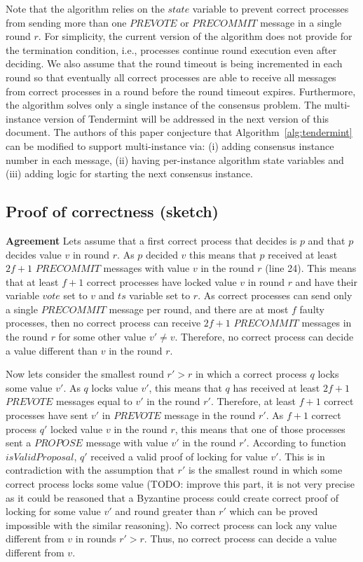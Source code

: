 Note that the algorithm relies on the $state$ variable to prevent correct processes from sending more than one $PREVOTE$ or $PRECOMMIT$ message in a single round $r$. For simplicity, the current version of the algorithm does not provide for the termination condition, i.e., processes continue round execution even after deciding. We also assume that the round timeout is being incremented in each round so that eventually all correct processes are able to receive all messages from correct processes in a round before the round timeout expires.  
Furthermore, the algorithm solves only a single instance of the consensus problem. The multi-instance version of Tendermint will be addressed in the next version of this document. The authors of this paper conjecture that Algorithm~\ref{alg:tendermint} can be modified to support multi-instance via: (i) adding consensus instance number in each message, (ii) having per-instance algorithm state variables and (iii) adding logic for starting the next consensus instance.

\subsection{Proof of correctness (sketch)}

\textbf{Agreement} Lets assume that a first correct process that decides is $p$ and that $p$ decides value $v$ in round $r$. As $p$ decided $v$ this means that $p$ received at least $2f+1$ $PRECOMMIT$ messages with value $v$ in the round $r$ (line 24). This means that at least $f+1$ correct processes have locked value $v$ in round $r$ and have their variable $vote$ set to $v$ and $ts$ variable set to $r$. As correct processes can send only a single $PRECOMMIT$ message per round, and there are at most $f$ faulty processes, then no correct process can receive $2f+1$ $PRECOMMIT$ messages in the round $r$ for some other value $v' \neq v$. Therefore, no correct process can decide a value different than $v$ in the round $r$. 

Now lets consider the smallest round $r' > r$ in which a correct process $q$ locks some value $v'$. As $q$ locks value $v'$, this means that $q$ has received at least $2f+1$ $PREVOTE$ messages equal to $v'$ in the round $r'$. Therefore, at least $f+1$ correct processes have sent $v'$ in $PREVOTE$ message in the round $r'$. As $f+1$ correct process $q'$ locked value $v$ in the round $r$, this means that one of those processes sent a $PROPOSE$ message with value $v'$ in the round $r'$. According to function $isValidProposal$, $q'$ received a valid proof of locking for value $v'$. This is in contradiction with the assumption that $r'$ is the smallest round in which some correct process locks some value (TODO: improve this part, it is not very precise as it could be reasoned that a Byzantine process could create correct proof of locking for some value $v'$ and round greater than $r'$ which can be proved impossible with the similar reasoning). No correct process can lock any value different from $v$ in rounds $r' > r$. Thus, no correct process can decide a value different from $v$. 

